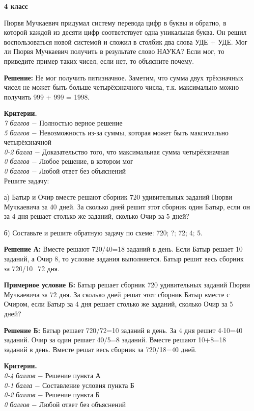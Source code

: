 \centerline{\bf \Large  4 класс}

 Пюрвя Мучкаевич придумал систему перевода цифр в буквы и обратно, в которой каждой из десяти цифр соответствует одна уникальная буква. Он решил воспользоваться новой системой и сложил в столбик два слова УДЕ + УДЕ. Мог ли Пюрвя Мучкаевич получить в результате слово НАУКА? Если мог, то приведите пример таких чисел, если нет, то объясните почему.

\textbf{Решение:} Не мог получить пятизначное. Заметим, что сумма двух трёхзначных чисел не может быть больше четырёхзначного числа, т.к. максимально можно получить 999 + 999 = 1998. 

\textbf{Критерии.} \\
\textit{7 баллов} $-$ Полностью верное решение\\
\textit{5 баллов} $-$ Невозможность из-за суммы, которая может быть максимально четырёхзначной\\
\textit{0-2 балла} $-$ Доказательство того, что максимальная сумма четырёхзначная\\
\textit{0 баллов} $-$ Любое решение, в котором мог\\
\textit{0 баллов} $-$ Любой ответ без объяснений\\

 Решите задачу:

а) Батыр и Очир вместе решают сборник 720 удивительных заданий Пюрви Мучкаевича за 40 дней. За сколько дней решит этот сборник один Батыр, если он за 4 дня решает столько же заданий, сколько Очир за 5 дней?

б) Составьте и решите обратную задачу по схеме: 720; ?; 72; 4; 5.

\textbf{Решение А:} Вместе решают 720/40=18 заданий в день. Если Батыр решает 10 заданий, а Очир 8, то условие задания выполняется. Батыр решит весь сборник за 720/10=72 дня.

\textbf{Примерное условие Б:} Батыр решает сборник 720 удивительных заданий Пюрви Мучкаевича за 72 дня. За сколько дней решат этот сборник Батыр вместе с Очиром, если Батыр за 4 дня решает столько же заданий, сколько Очир за 5 дней?

\textbf{Решение Б:} Батыр решает 720/72=10 заданий в день. За 4 дня решит 4$\cdot$10=40 заданий. Очир за один решает 40/5=8 заданий. Вместе решают 10+8=18 заданий в день. Вместе решат весь сборник за 720/18=40 дней.

\textbf{Критерии.} \\
\textit{0-4 баллов} $-$ Решение пункта А\\
\textit{0-1 балла} $-$ Составление условия пункта Б \\
\textit{0-2 баллов} $-$ Решение пункта Б\\
\textit{0 баллов} $-$ Любой ответ без объяснений\\

